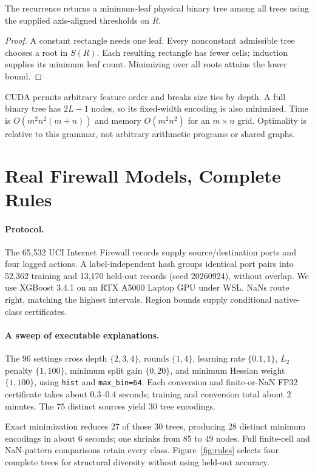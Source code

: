 \begin{proposition}
The recurrence returns a minimum-leaf physical binary tree among all trees using the supplied axis-aligned thresholds on $R$.
\end{proposition}
\begin{proof}
A constant rectangle needs one leaf. Every nonconstant admissible tree chooses a root in $S(R)$. Each resulting rectangle has fewer cells; induction supplies its minimum leaf count. Minimizing over all roots attains the lower bound.
\end{proof}
CUDA permits arbitrary feature order and breaks size ties by depth. A full binary tree has $2L-1$ nodes, so its fixed-width encoding is also minimized. Time is $O(m^2n^2(m+n))$ and memory $O(m^2n^2)$ for an $m\times n$ grid. Optimality is relative to this grammar, not arbitrary arithmetic programs or shared graphs.


\section{Real Firewall Models, Complete Rules}
\paragraph{Protocol.}
The 65,532 UCI Internet Firewall records \citep{firewall2019} supply source/destination ports and four logged actions. A label-independent hash groups identical port pairs into 52,362 training and 13,170 held-out records (seed 20260924), without overlap. We use XGBoost 3.4.1 on an RTX A5000 Laptop GPU under WSL. NaNs route right, matching the highest intervals. Region bounds supply conditional native-class certificates.

\paragraph{A sweep of executable explanations.}
The 96 settings cross depth $\{2,3,4\}$, rounds $\{1,4\}$, learning rate $\{0.1,1\}$, $L_2$ penalty $\{1,100\}$, minimum split gain $\{0,20\}$, and minimum Hessian weight $\{1,100\}$, using \texttt{hist} and \texttt{max\_bin=64}. Each conversion and finite-or-NaN FP32 certificate takes about 0.3--0.4 seconds; training and conversion total about 2 minutes. The 75 distinct sources yield 30 tree encodings.

Exact minimization reduces 27 of those 30 trees, producing 28 distinct minimum encodings in about 6 seconds; one shrinks from 85 to 49 nodes. Full finite-cell and NaN-pattern comparisons retain every class. Figure~\ref{fig:rules} selects four complete trees for structural diversity without using held-out accuracy.

